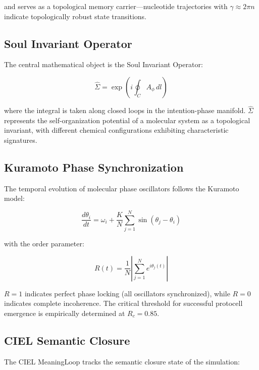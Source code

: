 \documentclass[11pt,a4paper]{article}
\begin{document}
and serves as a topological memory carrier---nucleotide trajectories with $\gamma \approx 2\pi n$ indicate topologically robust state transitions.

\subsection{Soul Invariant Operator}

The central mathematical object is the Soul Invariant Operator:

\begin{equation}
\hat{\Sigma} = \exp\left(i \oint_C A_\phi\,dl\right)
\end{equation}

where the integral is taken along closed loops in the intention-phase manifold. $\hat{\Sigma}$ represents the self-organization potential of a molecular system as a topological invariant, with different chemical configurations exhibiting characteristic signatures.

\subsection{Kuramoto Phase Synchronization}

The temporal evolution of molecular phase oscillators follows the Kuramoto model:

\begin{equation}
\frac{d\theta_i}{dt} = \omega_i + \frac{K}{N}\sum_{j=1}^{N} \sin(\theta_j - \theta_i)
\end{equation}

with the order parameter:

\begin{equation}
R(t) = \frac{1}{N}\left|\sum_{j=1}^{N} e^{i\theta_j(t)}\right|
\end{equation}

$R = 1$ indicates perfect phase locking (all oscillators synchronized), while $R = 0$ indicates complete incoherence. The critical threshold for successful protocell emergence is empirically determined at $R_c = 0.85$.

\subsection{CIEL Semantic Closure}

The CIEL MeaningLoop tracks the semantic closure state of the simulation:
\end{document}
